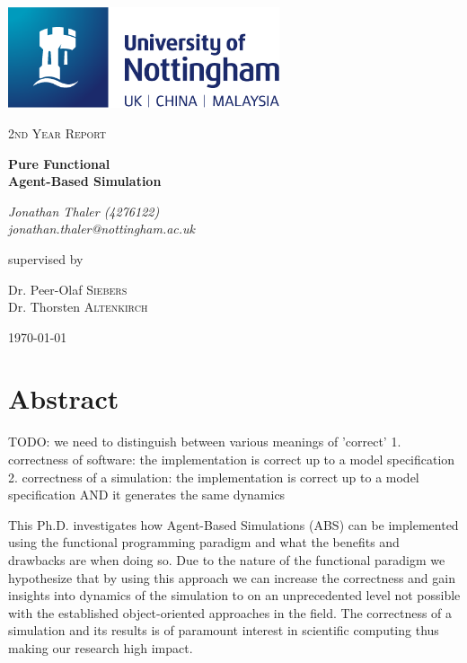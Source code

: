 \documentclass[oneside]{book}
\begin{document}
\begin{titlepage}
	\centering
	\includegraphics[width=0.60\textwidth]{./logo/UoN_Primary_Logo_RGB.png}\par\vspace{1cm}
	{\scshape\Large 2nd Year Report\par}
	\vspace{1.5cm}
	{\huge\bfseries Pure Functional \\ Agent-Based Simulation\par}
	\vspace{2cm}
	{\Large\itshape Jonathan Thaler (4276122) \\ jonathan.thaler@nottingham.ac.uk \par}
	\vfill
	supervised by\par
	Dr. Peer-Olaf \textsc{Siebers} \\
	Dr. Thorsten \textsc{Altenkirch}

	\vfill

	{\large \today\par}
\end{titlepage}

\cleardoublepage

\section*{Abstract}
TODO: we need to distinguish between various meanings of 'correct'
1. correctness of software: the implementation is correct up to a model specification
2. correctness of a simulation: the implementation is correct up to a model specification AND it generates the same dynamics

This Ph.D. investigates how Agent-Based Simulations (ABS) can be implemented using the functional programming paradigm and what the benefits and drawbacks are when doing so. Due to the nature of the functional paradigm we hypothesize that by using this approach we can increase the correctness and gain insights into dynamics of the simulation to on an unprecedented level not possible with the established object-oriented approaches in the field. The correctness of a simulation and its results is of paramount interest in scientific computing thus making our research high impact.
\end{document}
